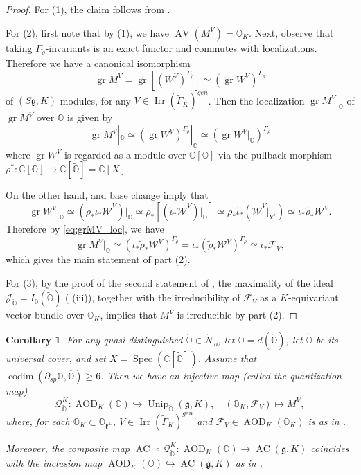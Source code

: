 \documentclass[11pt, a4paper]{amsart}
\newcommand{\C}{\mathbb{C}}
\newcommand{\J}{\mathcal{J}}
\newcommand{\g}{\mathfrak{g}}
\newcommand{\orb}{\mathbb{O}}
\newcommand{\orbk}{\orb_{K}}
\newcommand{\gr}{\operatorname{gr}}
\newcommand{\fg}{\mathfrak{g}}
\newcommand{\fk}{\mathfrak{k}}
\newcommand{\ckorb}{\check{\orb}}
\newcommand{\cF}{\mathcal{F}}
\newcommand{\cN}{\mathcal{N}}
\newcommand{\cW}{\mathcal{W}}
\newcommand{\WV}{W^{\scriptscriptstyle V}}
\newcommand{\cWV}{\cW^{\scriptscriptstyle V}}
\newcommand{\cWVbar}{\overline{\cW}^{\scriptscriptstyle V}}
\newcommand{\MV}{M^{\scriptscriptstyle V}}
\newcommand{\tGamma}{\widetilde{\Gamma}}
\DeclareMathOperator{\codim}{codim}
\DeclareMathOperator{\AV}{AV}
\DeclareMathOperator{\AC}{AC}
\DeclareMathOperator{\AOD}{AOD}
\DeclareMathOperator{\Unip}{Unip}
\newcommand{\AODK}{\AOD_K}
\newcommand{\UnipOv}{\Unip_{\ckorb}}
\newcommand{\quan}{\mathcal{Q}}
\newcommand{\spec}{\operatorname{Spec}}
\newcommand{\Irr}{\operatorname{Irr}}
\newtheorem{Cor}[Thm]{Corollary}
\theoremstyle{definition}
\numberwithin{equation}{section}
\begin{document}
\begin{proof}
For (1), the claim follows from .

For (2), first note that by (1), we have $\AV(\MV) = \overline{\orb}_K$. Next, observe that taking $\Gamma_{\tilde{\rho}}$-invariants is an exact functor and commutes with localizations. Therefore we have a canonical isomorphism
\begin{equation}
	\gr \MV = \gr [(\WV)^{\Gamma_{\tilde{\rho}}}] \simeq (\gr \WV)^{\Gamma_{\tilde{\rho}}}
\end{equation}
of $(S\fg, K)$-modules, for any $V \in \Irr(\tGamma_K)^{gen}$. 
Then the localization $\gr \MV|_{\orb}$ of $\gr \MV$ over $\orb$ is given by
\begin{equation}\label{eq:grMV_loc}
	\gr \MV|_{\orb} \simeq (\gr \WV)^{\Gamma_{\tilde{\rho}}}|_{\orb} \simeq (\gr \WV|_{\orb})^{\Gamma_{\tilde{\rho}}}
\end{equation}
where $\gr \WV$ is regarded as a module over $\C[\orb]$ via the pullback morphism $\rho^*: \C[\orb] \to \C[\widetilde{\orb}] = \C[X]$. 

On the other hand,  and base change imply that
\[
	\gr \WV|_{\orb} \simeq (\rho_* \tilde{\iota}_* \cWVbar)\big|_{\orb} \simeq \rho_* \left[ (\tilde{\iota}_* \cWVbar) \big|_{\widetilde{\orb}}\right] \simeq \rho_*\tilde{\iota}_* \left(\cWVbar \big|_{Y^\diamond} \right) \simeq \iota_* \tilde{\rho}_* \cWV.
\]
Therefore by \eqref{eq:grMV_loc}, we have 
\begin{equation}\label{eq:MV_AC}
	\gr \MV|_{\orb} \simeq (\iota_* \tilde{\rho}_* \cWV)^{\Gamma_{\tilde{\rho}}} = \iota_* (\tilde{\rho}_* \cWV)^{\Gamma_{\tilde{\rho}}} \simeq \iota_* \cF_V,
\end{equation} 
which gives the main statement of part (2). 

For (3), by the proof of the second statement of \cite[Proposition 7.3.1]{LY}, the maximality of the ideal $\J_{\ckorb} = I_0(\widetilde{\orb})$ ( (iii)), together with the irreducibility of $\cF_V$ as a $K$-equivariant vector bundle over $\orbk$, implies that $\MV$ is irreducible by part (2). 
\end{proof}

\begin{Cor} \label{cor:quant_map}
	For any quasi-distinguished $\ckorb \in \check{\cN}_o$, let $\orb=d(\ckorb)$, let $\widetilde{\orb}$ be its universal cover, and set $X = \spec(\C[\widetilde{\orb}])$. Assume that $\codim(\partial_{sp} \orb, \overline{\orb}) \geqslant 6$. Then we have an injective map (called the \emph{quantization map})
	\[ \quan_{\ckorb}^K: \AODK(\orb) \hookrightarrow \UnipOv(\g, K), \quad (\orbk, \cF_V) \mapsto \MV, \]
	where, for each $\orbk \subset \orb_{\fk^\perp}$, $V \in \Irr(\tGamma_K)^{gen}$ and $\cF_V \in \AODK(\orbk)$ is as in . 

	Moreover, the composite map $\AC \,\circ \,\quan_{\ckorb}^K: \AODK(\orb) \to \AC(\g,K)$ coincides with the inclusion map $\AODK(\orb) \hookrightarrow \AC(\g,K)$ as in . 
\end{Cor}
\end{document}
